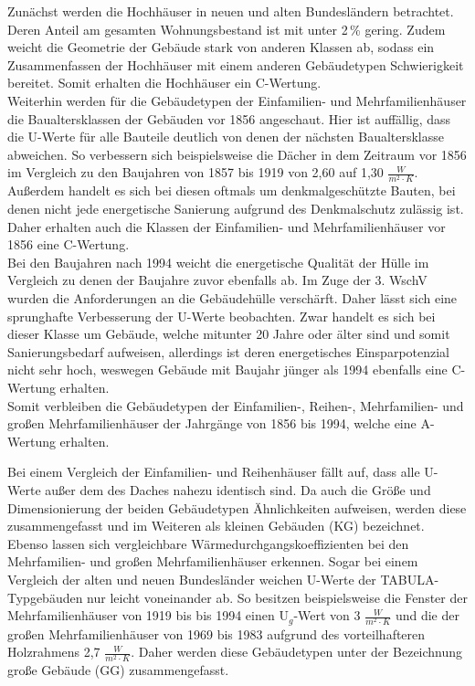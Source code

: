 Zunächst werden die Hochhäuser in neuen und alten Bundesländern betrachtet. 
Deren Anteil am gesamten Wohnungsbestand ist mit unter 2\,\% gering.
Zudem weicht die Geometrie der Gebäude stark von anderen Klassen ab, sodass ein Zusammenfassen der Hochhäuser mit einem anderen Gebäudetypen  Schwierigkeit bereitet.
Somit erhalten die Hochhäuser ein C-Wertung.\\
Weiterhin werden für die Gebäudetypen der Einfamilien- und Mehrfamilienhäuser die Baualtersklassen der Gebäuden vor 1856 angeschaut.
Hier ist auffällig, dass die U-Werte für alle Bauteile deutlich von denen der nächsten Baualtersklasse abweichen.
So verbessern sich beispielsweise die Dächer in dem Zeitraum vor 1856 im Vergleich zu den Baujahren von 1857 bis 1919 von 2,60 auf 1,30 \(\frac{W}{m^2 \cdot K}\).
Außerdem handelt es sich bei diesen oftmals um denkmalgeschützte Bauten, bei denen nicht jede energetische Sanierung aufgrund des Denkmalschutz zulässig ist.
Daher erhalten auch die Klassen der Einfamilien- und Mehrfamilienhäuser vor 1856 eine C-Wertung.\\
Bei den Baujahren nach 1994 weicht die energetische Qualität der Hülle im Vergleich zu denen der Baujahre zuvor ebenfalls ab.
Im Zuge der 3. WschV wurden die Anforderungen an die Gebäudehülle verschärft.
Daher lässt sich eine sprunghafte Verbesserung der U-Werte beobachten.
Zwar handelt es sich bei dieser Klasse um Gebäude, welche mitunter 20 Jahre  oder älter sind und somit Sanierungsbedarf aufweisen, allerdings ist deren energetisches Einsparpotenzial nicht sehr hoch, weswegen Gebäude mit Baujahr jünger als 1994 ebenfalls eine C-Wertung erhalten.\\
Somit verbleiben die Gebäudetypen der Einfamilien-, Reihen-, Mehrfamilien- und großen Mehrfamilienhäuser der Jahrgänge von 1856 bis 1994, welche eine A-Wertung erhalten.

Bei einem Vergleich der Einfamilien- und Reihenhäuser fällt auf, dass alle U-Werte außer dem des Daches nahezu identisch sind.
Da auch die Größe und Dimensionierung der beiden Gebäudetypen Ähnlichkeiten aufweisen, werden diese zusammengefasst und im Weiteren als kleinen Gebäuden (KG) bezeichnet.\\
Ebenso lassen sich vergleichbare Wärmedurchgangskoeffizienten bei den Mehrfamilien- und großen Mehrfamilienhäuser erkennen.
Sogar bei einem Vergleich der alten und neuen Bundesländer weichen U-Werte der TABULA-Typgebäuden nur leicht voneinander ab.
So besitzen beispielsweise die Fenster der Mehrfamilienhäuser von 1919 bis bis 1994 einen U\(_g\)-Wert von 3 \(\frac{W}{m^2 \cdot K}\) und die der großen Mehrfamilienhäuser von 1969 bis 1983 aufgrund des vorteilhafteren Holzrahmens 2,7 \(\frac{W}{m^2 \cdot K}\).
Daher werden diese Gebäudetypen unter der Bezeichnung große Gebäude (GG) zusammengefasst.

